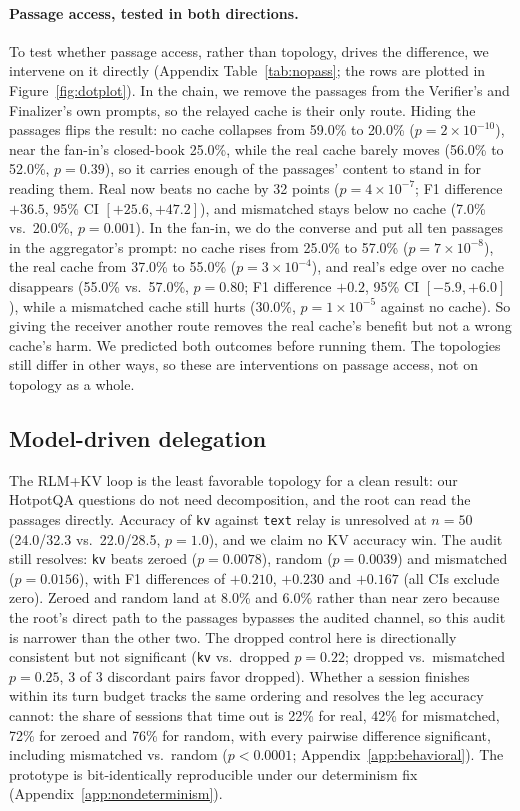 \documentclass[11pt]{article}
\begin{document}
\paragraph{Passage access, tested in both directions.} To test whether passage
access, rather than topology, drives the difference, we intervene on it directly
(Appendix Table~\ref{tab:nopass}; the rows are plotted in
Figure~\ref{fig:dotplot}). In the chain, we remove the passages from the
Verifier's and Finalizer's own prompts, so the relayed cache is their only route.
Hiding the passages flips the result: no cache collapses from 59.0\% to
20.0\% ($p=2\times10^{-10}$), near the fan-in's closed-book 25.0\%, while the real
cache barely moves (56.0\% to 52.0\%, $p=0.39$), so it carries enough of the
passages' content to stand in for reading them. Real now beats no cache by 32
points ($p=4\times10^{-7}$; F1 difference $+36.5$, 95\% CI $[+25.6,+47.2]$), and
mismatched stays below no cache (7.0\% vs.\ 20.0\%, $p=0.001$). In the
fan-in, we do the converse and put all ten passages in the aggregator's prompt:
no cache rises from 25.0\% to 57.0\% ($p=7\times10^{-8}$), the real cache from
37.0\% to 55.0\% ($p=3\times10^{-4}$), and real's edge over no cache disappears
(55.0\% vs.\ 57.0\%, $p=0.80$; F1 difference $+0.2$, 95\% CI $[-5.9,+6.0]$), while
a mismatched cache still hurts (30.0\%, $p=1\times10^{-5}$ against no cache). So
giving the receiver another route removes the real cache's benefit but not
a wrong cache's harm. We predicted both outcomes before running them. The
topologies still differ in other ways, so these are interventions on passage
access, not on topology as a whole.

\subsection{Model-driven delegation}

The RLM+KV loop is the least favorable topology for a clean result: our
HotpotQA questions do not need decomposition, and the root can read the
passages directly. Accuracy of \texttt{kv} against \texttt{text} relay is
unresolved at $n{=}50$ (24.0/32.3 vs.\ 22.0/28.5, $p=1.0$), and we claim
no KV accuracy win. The audit still resolves: \texttt{kv} beats zeroed
($p=0.0078$), random ($p=0.0039$) and mismatched ($p=0.0156$), with F1
differences of $+0.210$, $+0.230$ and $+0.167$ (all CIs exclude zero).
Zeroed and random land at 8.0\% and 6.0\% rather than near zero because
the root's direct path to the passages bypasses the audited channel, so
this audit is narrower than the other two. The dropped control here is
directionally consistent but not significant (\texttt{kv} vs.\ dropped
$p=0.22$; dropped vs.\ mismatched $p=0.25$, 3 of 3 discordant pairs favor
dropped). Whether a session finishes within its turn budget tracks the
same ordering and resolves the leg accuracy cannot: the share of sessions
that time out is 22\% for real, 42\% for mismatched, 72\% for zeroed and 76\%
for random, with every pairwise difference significant, including mismatched
vs.\ random ($p<0.0001$; Appendix~\ref{app:behavioral}). The prototype is
bit-identically reproducible under our determinism fix
(Appendix~\ref{app:nondeterminism}).
\end{document}
